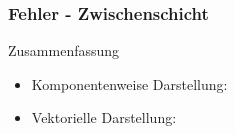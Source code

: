 \begin{frame}
\frametitle{Fehler - Zwischenschicht} 
\vspace{-10mm}


\vspace{-7mm}


\begin{block}{Zusammenfassung}
\begin{itemize}
\item Komponentenweise Darstellung: 
\end{itemize}

\begin{itemize}
\item Vektorielle Darstellung: 
\end{itemize}

\end{block}
\end{frame}


